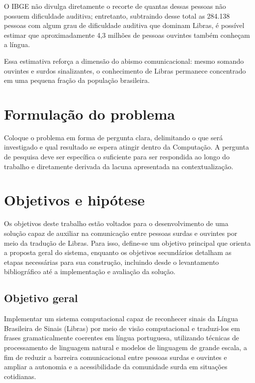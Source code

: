 \documentclass[
    12pt,                %
    openright,           %
    oneside,             %
    a4paper,             %
    english,             %
    brazil               %
]{abntex2}
\begin{document}
O IBGE não divulga diretamente o recorte de quantas dessas pessoas não possuem dificuldade auditiva; entretanto, subtraindo desse total as 284.138 pessoas com algum grau de dificuldade auditiva que dominam Libras, é possível estimar que aproximadamente 4,3 milhões de pessoas ouvintes também conheçam a língua. 

Essa estimativa reforça a dimensão do abismo comunicacional: mesmo somando ouvintes e surdos sinalizantes, o conhecimento de Libras permanece concentrado em uma pequena fração da população brasileira.

\section{Formulação do problema}
\label{sec:problema}

Coloque o problema em forma de pergunta clara, delimitando o que será investigado e qual resultado se espera atingir dentro da Computação. A pergunta de pesquisa deve ser específica o suficiente para ser respondida ao longo do trabalho e diretamente derivada da lacuna apresentada na contextualização.

\section{Objetivos e hipótese}
\label{sec:objetivos}

Os objetivos deste trabalho estão voltados para o desenvolvimento de uma solução capaz de auxiliar na comunicação entre pessoas surdas e ouvintes por meio da tradução de Libras. Para isso, define-se um objetivo principal que orienta a proposta geral do sistema, enquanto os objetivos secundários detalham as etapas necessárias para sua construção, incluindo desde o levantamento bibliográfico até a implementação e avaliação da solução.

\subsection{Objetivo geral}

Implementar um sistema computacional capaz de reconhecer sinais da Língua Brasileira de Sinais (Libras) por meio de visão computacional e traduzi-los em frases gramaticalmente coerentes em língua portuguesa, utilizando técnicas de processamento de linguagem natural e modelos de linguagem de grande escala, a fim de reduzir a barreira comunicacional entre pessoas surdas e ouvintes e ampliar a autonomia e a acessibilidade da comunidade surda em situações cotidianas.
\end{document}
